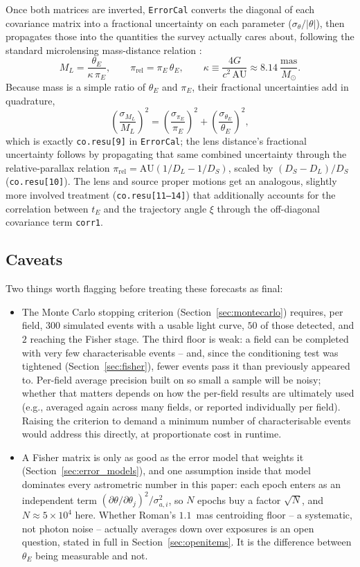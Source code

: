 \documentclass[english,10pt,a4paper]{article}
\begin{document}
	Once both matrices are inverted, \texttt{ErrorCal} converts the diagonal of each covariance matrix into a fractional uncertainty on each parameter ($\sigma_\theta/|\theta|$), then propagates those into the quantities the survey actually cares about, following the standard microlensing mass-distance relation \cite{Gould2000Formalism}:
	\[
	M_L = \frac{\theta_E}{\kappa\,\pi_E}, \qquad \pi_{\mathrm{rel}} = \pi_E\,\theta_E, \qquad \kappa \equiv \frac{4G}{c^2\,\mathrm{AU}} \approx 8.14\ \frac{\mathrm{mas}}{M_\odot}.
	\]
	Because mass is a simple ratio of $\theta_E$ and $\pi_E$, their fractional uncertainties add in quadrature,
	\[
	\left(\frac{\sigma_{M_L}}{M_L}\right)^2 = \left(\frac{\sigma_{\pi_E}}{\pi_E}\right)^2 + \left(\frac{\sigma_{\theta_E}}{\theta_E}\right)^2,
	\]
	which is exactly \texttt{co.resu[9]} in \texttt{ErrorCal}; the lens distance's fractional uncertainty follows by propagating that same combined uncertainty through the relative-parallax relation $\pi_{\mathrm{rel}}=\mathrm{AU}(1/D_L-1/D_S)$, scaled by $(D_S-D_L)/D_S$ (\texttt{co.resu[10]}). The lens and source proper motions get an analogous, slightly more involved treatment (\texttt{co.resu[11--14]}) that additionally accounts for the correlation between $t_E$ and the trajectory angle $\xi$ through the off-diagonal covariance term \texttt{corr1}.
	
	\subsection{Caveats}
	\label{sec:fisher_caveats}
	
	Two things worth flagging before treating these forecasts as final:
	\begin{itemize}
		\item The Monte Carlo stopping criterion (Section~\ref{sec:montecarlo}) requires, per field, $300$ simulated events with a usable light curve, $50$ of those detected, and $2$ reaching the Fisher stage. The third floor is weak: a field can be completed with very few characterisable events -- and, since the conditioning test was tightened (Section~\ref{sec:fisher}), fewer events pass it than previously appeared to. Per-field average precision built on so small a sample will be noisy; whether that matters depends on how the per-field results are ultimately used (e.g., averaged again across many fields, or reported individually per field). Raising the criterion to demand a minimum number of characterisable events would address this directly, at proportionate cost in runtime.
		\item A Fisher matrix is only as good as the error model that weights it (Section~\ref{sec:error_models}), and one assumption inside that model dominates every astrometric number in this paper: each epoch enters as an independent term $(\partial\theta/\partial\theta_j)^2/\sigma_{a,i}^2$, so $N$ epochs buy a factor $\sqrt{N}$, and $N\approx5\times10^{4}$ here. Whether Roman's $1.1$~mas centroiding floor -- a systematic, not photon noise -- actually averages down over exposures is an open question, stated in full in Section~\ref{sec:openitems}. It is the difference between $\theta_E$ being measurable and not.
	\end{itemize}
	
\end{document}
